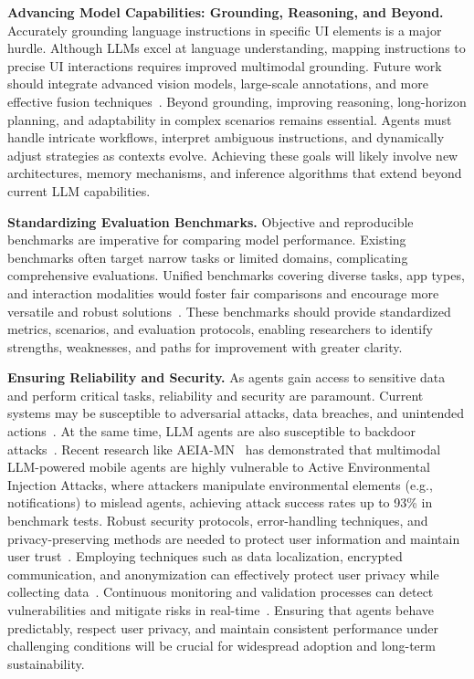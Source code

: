 \noindent\textbf{Advancing Model Capabilities: Grounding, Reasoning, and Beyond.}
Accurately grounding language instructions in specific UI elements is a major hurdle. Although LLMs excel at language understanding, mapping instructions to precise UI interactions requires improved multimodal grounding. Future work should integrate advanced vision models, large-scale annotations, and more effective fusion techniques~\cite{gou2024navigating, cheng2024seeclick, you2024ferret, zhang2024ui-hawk}.
Beyond grounding, improving reasoning, long-horizon planning, and adaptability in complex scenarios remains essential. Agents must handle intricate workflows, interpret ambiguous instructions, and dynamically adjust strategies as contexts evolve. Achieving these goals will likely involve new architectures, memory mechanisms, and inference algorithms that extend beyond current LLM capabilities.


\noindent\textbf{Standardizing Evaluation Benchmarks.}
Objective and reproducible benchmarks are imperative for comparing model performance. Existing benchmarks often target narrow tasks or limited domains, complicating comprehensive evaluations. Unified benchmarks covering diverse tasks, app types, and interaction modalities would foster fair comparisons and encourage more versatile and robust solutions~\cite{wang2024mobileagentbench, xu2024androidlab, lu2024guiodyssey, rawles2024androidinthewild}.
These benchmarks should provide standardized metrics, scenarios, and evaluation protocols, enabling researchers to identify strengths, weaknesses, and paths for improvement with greater clarity.


\noindent\textbf{Ensuring Reliability and Security.}
As agents gain access to sensitive data and perform critical tasks, reliability and security are paramount. Current systems may be susceptible to adversarial attacks, data breaches, and unintended actions~\cite{wu2024adversarial}. At the same time, LLM agents are also susceptible to backdoor attacks~\cite{yang2024watch,wang2024badagent}. Recent research like AEIA-MN~\cite{chen2025aeia} has demonstrated that multimodal LLM-powered mobile agents are highly vulnerable to Active Environmental Injection Attacks, where attackers manipulate environmental elements (e.g., notifications) to mislead agents, achieving attack success rates up to 93\% in benchmark tests. Robust security protocols, error-handling techniques, and privacy-preserving methods are needed to protect user information and maintain user trust~\cite{ma2024coco,bai2024digirl}. Employing techniques such as data localization, encrypted communication, and anonymization can effectively protect user privacy while collecting data~\cite{wang2025fedmobileagent}.
Continuous monitoring and validation processes can detect vulnerabilities and mitigate risks in real-time~\cite{lee2023exploremobilegpt}. Ensuring that agents behave predictably, respect user privacy, and maintain consistent performance under challenging conditions will be crucial for widespread adoption and long-term sustainability.


